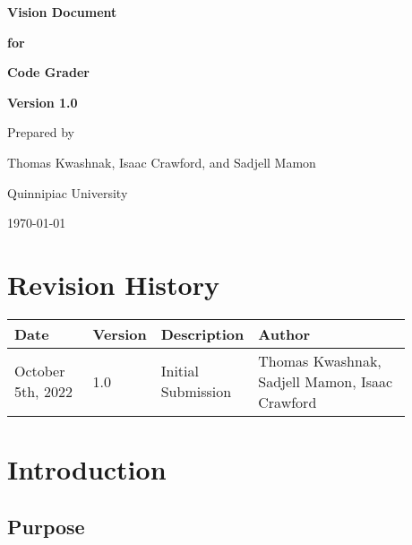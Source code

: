 \documentclass{article}
\begin{document}
\begin{titlepage}
  \vspace*{1cm}

  \Huge
  \textbf{Vision Document}

  \vspace{0.5cm}

  \textbf{for}

  \vspace{0.5cm}

  \textbf{Code Grader}

  \vspace{2cm}

  \LARGE
  \textbf{Version 1.0}

  \vspace{3cm}

  Prepared by

  Thomas Kwashnak, Isaac Crawford, and Sadjell Mamon

  \vspace{0.75cm}
  Quinnipiac University

  \vspace{7cm}

  \today
\end{titlepage}

\section*{Revision History}

\begin{tabular}{| p{0.2\linewidth} | p{0.075\linewidth} | p{0.2\linewidth} | p{0.4\linewidth} |}
  \hline
  Date & Version & Description & Author\\
  \hline
  \hline
  October 5th, 2022 & 1.0 & Initial Submission & Thomas Kwashnak, Sadjell Mamon, Isaac Crawford \\
  \hline

\end{tabular}

\newpage

\tableofcontents

\newpage



\section{Introduction}

\subsection{Purpose}
\end{document}

